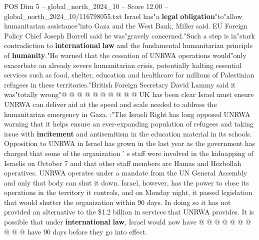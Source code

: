 \begin{textsample}{POS Dim 5 – global\_north\_2024\_10 – Score 12.00 – global\_north\_2024\_10/116798055.txt}
Israel has"a \textbf{legal} \textbf{obligation}"to"allow humanitarian assistance"into Gaza and the West Bank, Miller said.
EU Foreign Policy Chief Joseph Borrell said he was"gravely concerned."Such a step is in"stark contradiction to \textbf{international} \textbf{law} and the fundamental humanitarian principle of \textbf{humanity}."He warned that the cessation of UNRWA operations would"only exacerbate an already severe humanitarian crisis, potentially halting essential services such as food, shelter, education and healthcare for millions of Palestinian refugees in these territories."British Foreign Secretary David Lammy said it was"totally wrong"@ @ @ @ @ @ @ @ @ @ UK has been clear Israel must ensure UNRWA can deliver aid at the speed and scale needed to address the humanitarian emergency in Gaza. :"The Israeli Right has long opposed UNRWA warning that it helps ensure an ever-expanding population of refugees and taking issue with \textbf{incitement} and antisemitism in the education material in its schools.
Opposition to UNRWA in Israel has grown in the last year as the government has charged that some of the organization ' s staff were involved in the kidnapping of Israelis on October 7 and that other staff members are Hamas and Hezbollah operatives.
UNRWA operates under a mandate from the UN General Assembly and only that body can shut it down.
Israel, however, has the power to close its operations in the territory it controls, and on Monday night, it passed legislation that would shutter the organization within 90 days.
In doing so it has not provided an alternative to the \$1.2 billion in services that UNRWA provides.
It is possible that under \textbf{international} \textbf{law}, Israel would now have @ @ @ @ @ @ @ @ @ @ have 90 days before they go into effect.

\end{textsample}
